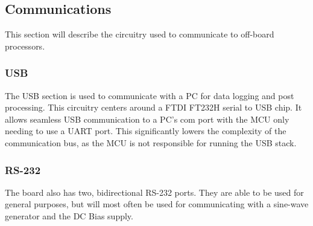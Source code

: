 \subsection{Communications}

This section will describe the circuitry used to communicate to off-board processors.

\subsubsection{USB}
The USB section is used to communicate with a PC for data logging and post processing. This circuitry centers around a FTDI FT232H serial to USB chip. It allows seamless USB communication to a PC's com port with the MCU only needing to use a UART port. This significantly lowers the complexity of the communication bus, as the MCU is not responsible for running the USB stack.

\subsubsection{RS-232}
The board also has two, bidirectional RS-232 ports. They are able to be used for general purposes, but will most often be used for communicating with a sine-wave generator and the DC Bias supply.

